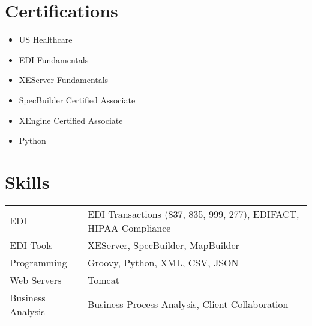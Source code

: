 \documentclass[a4paper,12pt]{article}
\begin{document}
\section{Certifications}
\begin{itemize}[leftmargin=1em]
    \item US Healthcare
    \item EDI Fundamentals
    \item XEServer Fundamentals
    \item SpecBuilder Certified Associate
    \item XEngine Certified Associate
    \item Python
\end{itemize}

\section{Skills}
\begin{tabularx}{\linewidth}{@{}l X@{}}
EDI & EDI Transactions (837, 835, 999, 277), EDIFACT, HIPAA Compliance \\
EDI Tools & XEServer, SpecBuilder, MapBuilder \\
Programming & Groovy, Python, XML, CSV, JSON \\
Web Servers & Tomcat \\
Business Analysis & Business Process Analysis, Client Collaboration \\
\end{tabularx}

\vfill
{}
\end{document}
